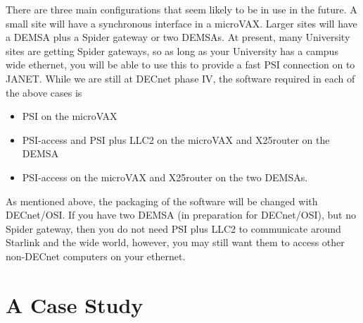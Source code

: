 There are three  main configurations that seem likely to be in
use in the future. A small site will have a synchronous interface in a
microVAX. Larger sites will have a DEMSA plus a Spider gateway or two
DEMSAs. At present, many University sites are getting Spider gateways, so
as long as your University has a campus wide ethernet, you will be able
to use this to provide a fast PSI connection on to JANET. While we are
still at DECnet phase IV, the software required in each of the above
cases is

\begin{itemize}
\item PSI on the microVAX
\item PSI-access and PSI plus LLC2 on the microVAX and X25router on the DEMSA
\item PSI-access on the microVAX and X25router on the two DEMSAs.
\end{itemize}

As mentioned above, the packaging of the software will be changed with
DECnet/OSI. If you have two DEMSA (in preparation for DECnet/OSI), but no
Spider gateway, then you do not need PSI plus LLC2 to communicate around
Starlink and the wide world, however, you may still want them to access other
non-DECnet computers on your ethernet. 

\section{A Case Study}

